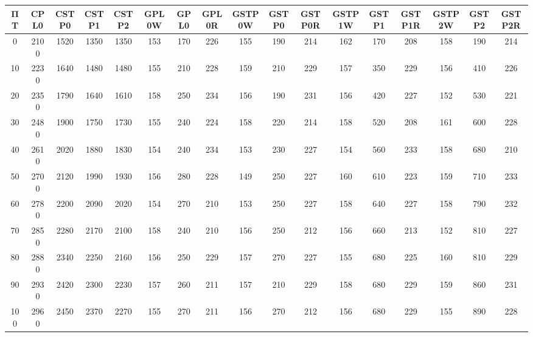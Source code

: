 \begin{tabular}{|c|c|c|c|c|c|c|c|c|c|c|c|c|c|c|c|c|}
\hline
ΠΤ&CPL0&CSTP0&CSTP1&CSTP2&GPL0W&GPL0&GPL0R&GSTP0W&GSTP0&GSTP0R&GSTP1W&GSTP1&GSTP1R&GSTP2W&GSTP2&GSTP2R\\\hline
\hline
0&2100&1520&1350&1350&153&170&226&155&190&214&162&170&208&158&190&214\\
\hline
10&2230&1640&1480&1480&155&210&228&159&210&229&157&350&229&156&410&226\\
\hline
20&2350&1790&1640&1610&158&250&234&156&190&231&156&420&227&152&530&221\\
\hline
30&2480&1900&1750&1730&155&240&224&158&220&214&158&520&208&161&600&228\\
\hline
40&2610&2020&1880&1830&154&240&234&153&230&227&154&560&233&158&680&210\\
\hline
50&2700&2120&1990&1930&156&280&228&149&250&227&160&610&223&159&710&233\\
\hline
60&2780&2200&2090&2020&154&270&210&153&250&227&158&640&227&158&790&232\\
\hline
70&2850&2280&2170&2100&158&240&210&156&250&212&156&660&213&152&810&227\\
\hline
80&2880&2340&2250&2160&156&250&229&157&270&227&155&680&225&160&810&229\\
\hline
90&2930&2420&2300&2230&157&260&211&157&210&229&158&680&229&159&860&231\\
\hline
100&2960&2450&2370&2270&155&270&211&156&270&212&156&680&229&155&890&228\\
\hline
\end{tabular}
